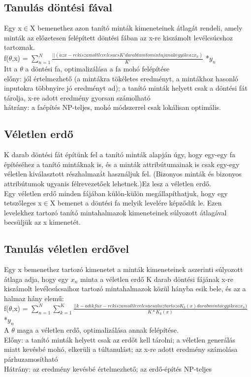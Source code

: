 \documentclass{article}
\begin{document}
	 \subsection{Tanulás döntési fával}
	 Egy x$\in$X bemenethez azon tanító minták kimeneteinek átlagát rendeli, amely minták az előzetesen felépített döntési fában az x-re kiszámolt levélcsúcshoz tartoznak.\\
	  f($\theta$,x) = $\sum_{n=1}^{N}$$\frac{||(az x-re kiszamolt levelcsucs K' darab tanito mintajanak egyike az x_n)}{K'}$ *$y_n$\\
	  Itt a $\theta$ a döntési fa, optimalizálása a fa mohó felépítése\\
	  előny: jól értelmezhető (a mintákra tökéletes eredményt, a mintákhoz hasonló inputokra többnyire jó eredményt ad); a tanító minták helyett csak a döntési fát tárolja, x-re adott eredmény gyorsan számolható\\
	  hátrány: a faépítés NP-teljes, mohó módszerrel csak lokálisan optimális.\\
	  
	  \subsection{Véletlen erdő}
	  K darab döntési fát építünk fel a tanító minták alapján úgy, hogy egy-egy fa építéséhez a tanító mintáknak is, és a minták attribútumainak is csak egy-egy véletlen kiválasztott részhalmazát használjuk fel. (Bizonyos minták és bizonyos attribútumok ugyanis félrevezetőek lehetnek.)Ez lesz a véletlen erdő.\\
	  Egy véletlen erdő minden fájában külön-külön megállapíthatjuk, hogy egy tetszőleges x$\in$X bemenet a döntési fa melyik levelére képződik le. Ezen levelekhez tartozó tanító mintahalmazok kimeneteinek súlyozott átlagával becsüljük az x kimenetét.
	  
	  \subsection{Tanulás véletlen erdővel}
	  Egy x bemenethez tartozó kimenetet a minták kimeneteinek aszerinti súlyozott átlaga adja, hogy egy $x_n$ minta a véletlen erdő K darab döntési fájának x-re kiszámolt levélcsúcsaihoz tartozó mintahalmazok közül hányba esik bele, és az a halmaz hány elemű:\\
	   f($\theta$,x) = $\sum_{n=1}^{N}$$\sum_{k=1}^{K}$$\frac{||k-adik fa x-re kiszamolt levelcsucsahoz tartozo K_k(x) darab minta egyike az x_n)}{K*K_k(x)}$ *$y_n$\\
	   A $\theta$ maga a véletlen erdő, optimalizálása annak felépítése.\\
	   Előny: a tanító minták helyett csak az erdőt kell tárolni; a véletlen generálás miatt kevésbé mohó, elkerüli a túltanulást; az x-re adott eredmény számolása párhuzamosítható\\
	   Hátrány: az eredmény kevésbé értelmezhető; az erdő-építés NP-teljes\\
	 
	 	
		
	
\end{document}
